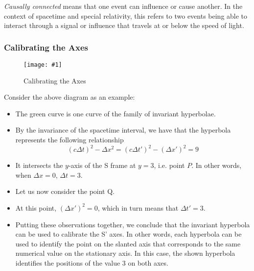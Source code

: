 \documentclass[a4paper,12pt]{article}
\newcommand{\img}[4]{\begin{center}
  \begin{figure}[H]
    \centering
    \texttt{[image: \#1]}
    \caption{#3}
    \label{fig:#4}
  \end{figure}
\end{center}}
\begin{document}
\textit{Causally connected} means that one event can influence or cause another. In the context of spacetime and special relativity, this refers to two events being able to interact through a signal or influence that travels at or below the speed of light.

\subsubsection{Calibrating the Axes}

\img{calibrate.png}{0.6}{Calibrating the Axes}{calibrate}

Consider the above diagram as an example:
\begin{itemize}
  \item The green curve is one curve of the family of invariant hyperbolae.
  \item By the invariance of the spacetime interval, we have that the hyperbola represents the following relationship
        $$(c\Delta t)^2 - \Delta x^2 = (c\Delta t')^2 - (\Delta x')^2 = 9$$
  \item It intersects the $y$-axis of the S frame at $y = 3$, i.e. point $P$. In other words, when $\Delta x = 0$, $\Delta t = 3$.
  \item Let us now consider the point Q.
  \item At this point, $(\Delta x')^2 = 0$, which in turn means that $\Delta t' = 3$.
  \item Putting these observations together, we conclude that the invariant hyperbola can be used to calibrate the S' axes. In other words, each hyperbola can be used to identify the point on the slanted axis that corresponds to the same numerical value on the stationary axis. In this case, the shown hyperbola identifies the positions of the value 3 on both axes.
\end{itemize}
\end{document}
